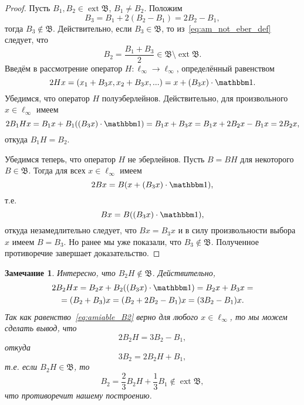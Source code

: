 \documentclass[a4paper,14pt]{article} %
\DeclareMathOperator{\ext}{ext}
\newcommand{\B}{\ensuremath{\mathfrak{B}}}
\newcommand{\one}{\ensuremath{\mathbbm 1}}
\theoremstyle{plain}
\newtheorem{remark}[lemma]{Замечание}
\begin{document}
	\begin{proof}
		Пусть $B_1, B_2 \in \ext \B$, $B_1 \ne B_2$.
		Положим
		\begin{equation}
			\label{eq:am_not_eber_def}
			B_3 = B_1 + 2(B_2-B_1) = 2B_2-B_1,
		\end{equation}
		тогда $B_3 \notin \B$.
		Действительно, если $B_3 \in \B$, то из~\eqref{eq:am_not_eber_def} следует, что
		\begin{equation}
			B_2 = \frac{B_1 + B_3}2 \in \B \setminus \ext \B
			.
		\end{equation}
		Введём в рассмотрение оператор $H:\ell_\infty\to\ell_\infty$, определённый равенством
		\begin{equation}
			2Hx = (x_1 + B_3x, x_2 + B_3x, ...) = x + (B_3 x) \cdot \one
			.
		\end{equation}
		Убедимся, что оператор $H$ полуэберлейнов.
		Действительно, для произвольного $x\in\ell_\infty$ имеем
		\begin{equation}
			2 B_1 H x = B_1 x + B_1 ((B_3 x) \cdot\one) = B_1 x + B_3 x =
			B_1 x + 2 B_2 x - B_1 x = 2B_2 x
			,
		\end{equation}
		откуда $B_1 H = B_2$.

		Убедимся теперь, что оператор $H$ не эберлейнов.
		Пусть $B = BH$ для некоторого $B\in\B$.
		Тогда для всех $x\in\ell_\infty$ имеем
		\begin{equation}
			2Bx = B (x + (B_3 x) \cdot \one)
			,
		\end{equation}
		т.е.
		\begin{equation}
			Bx =  B((B_3 x) \cdot \one)
			,
		\end{equation}
		откуда незамедлительно следует, что $Bx = B_3x$ и в силу произвольности выбора $x$ имеем $B=B_3$.
		Но ранее мы уже показали, что $B_3\notin \B$.
		Полученное противоречие завершает доказательство.
	\end{proof}

	\begin{remark}
		Интересно, что $B_2H\notin \B$.
		Действительно,
		\begin{multline}
			\label{eq:amiable_B2}
			2B_2 H x = B_2 x + B_2((B_3 x)\cdot \one) = B_2 x + B_3 x  =
			\\=
			(B_2 + B_3) x  = (B_2+2B_2-B_1)x = (3B_2-B_1)x
			.
		\end{multline}
		Так как равенство~\eqref{eq:amiable_B2} верно для любого $x\in\ell_\infty$,
		то мы можем сделать вывод, что
		\begin{equation}
			2B_2H = 3B_2-B_1
			,
		\end{equation}
		откуда
		\begin{equation}
			3B_2 = 2B_2H  + B_1
			,
		\end{equation}
		т.е. если $B_2H\in\B$, то
		\begin{equation}
			B_2 = \frac23 B_2H  + \frac13 B_1 \notin \ext\B
			,
		\end{equation}
		что противоречит нашему построению.
	\end{remark}
\end{document}
